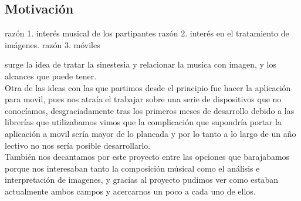 \subsection{Motivación}


razón 1. interés musical de los partipantes
razón 2. interés en el tratamiento de imágenes.
razón 3. móviles

surge la idea de tratar la sinestesia y relacionar la musica con imagen, y los alcances que puede tener.\\



Otra de las ideas con las que partimos desde el principio fue hacer la aplicación para movil, pues nos atraía el trabajar sobre una serie de dispositivos que no conocíamos, desgraciadamente tras los primeros meses de desarrollo debido a las librerías que utilizabamos vimos que la complicación que supondría portar la aplicación a movil sería mayor de lo planeada y por lo tanto a lo largo de un año lectivo no nos sería posible desarrollarlo.
\\También nos decantamos por este proyecto entre las opciones que barajabamos porque nos interesaban tanto la composición músical como el análisis e interpretación de imagenes, y gracias al proyecto pudimos ver como estaban actualmente ambos campos y acercarnos un poco a cada uno de ellos.
